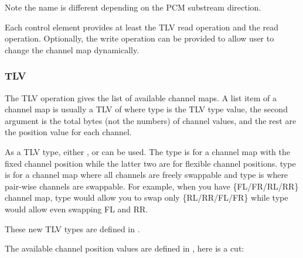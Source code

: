 \documentclass[a4paper,8pt,english]{sphinxmanual}
\begin{document}
Note the name is different depending on the PCM substream direction.

Each control element provides at least the TLV read operation and the
read operation.  Optionally, the write operation can be provided to
allow user to change the channel map dynamically.


\subsubsection{TLV}
\label{sound/designs/channel-mapping-api:tlv}
The TLV operation gives the list of available channel
maps.  A list item of a channel map is usually a TLV of
where type is the TLV type value, the second argument is the total
bytes (not the numbers) of channel values, and the rest are the
position value for each channel.

As a TLV type, either ,
 or  can be used.
The  type is for a channel map with the fixed channel position
while the latter two are for flexible channel positions.  type is
for a channel map where all channels are freely swappable and 
type is where pair-wise channels are swappable.  For example, when you
have \{FL/FR/RL/RR\} channel map,  type would allow you to swap
only \{RL/RR/FL/FR\} while  type would allow even swapping FL and
RR.

These new TLV types are defined in .

The available channel position values are defined in ,
here is a cut:
\end{document}
